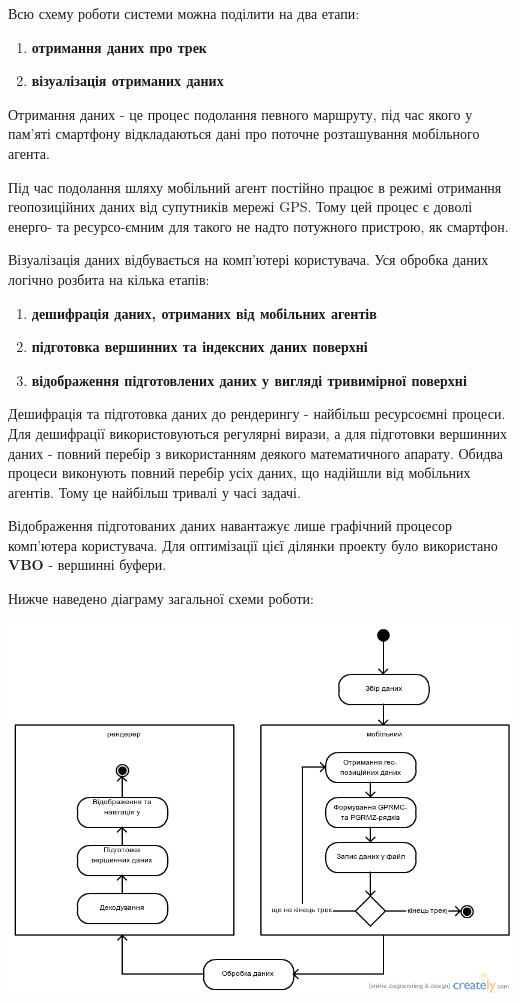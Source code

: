 \documentclass[simple,a4paper,14pt,ukrainian,utf8]{eskdtext}
\begin{document}
    Всю схему роботи системи можна поділити на два етапи:
    
    \begin{enumerate}
    	\item \textbf{отримання даних про трек}
    	\item \textbf{візуалізація отриманих даних}
    \end{enumerate}
    
    Отримання даних - це процес подолання певного маршруту, під час якого у пам’яті смартфону відкладаються дані про поточне розташування мобільного агента.
    
    Під час подолання шляху мобільний агент постійно працює в режимі отримання геопозиційних даних від супутників мережі GPS. Тому цей процес є доволі енерго- та ресурсо-ємним для такого не надто потужного пристрою, як смартфон.
    
    Візуалізація даних відбувається на комп’ютері користувача. Уся обробка даних логічно розбита на кілька етапів:
    
    \begin{enumerate}
    	\item \textbf{дешифрація даних, отриманих від мобільних агентів}
    	\item \textbf{підготовка вершинних та індексних даних поверхні}
    	\item \textbf{відображення підготовлених даних у вигляді тривимірної поверхні}
    \end{enumerate}
    
    Дешифрація та підготовка даних до рендерингу - найбільш ресурсоємні процеси. Для дешифрації використовуються регулярні вирази, а для підготовки вершинних даних - повний перебір з використанням деякого математичного апарату. Обидва процеси виконують повний перебір усіх даних, що надійшли від мобільних агентів. Тому це найбільш тривалі у часі задачі.
    
    Відображення підготованих даних навантажує лише графічний процесор комп’ютера користувача. Для оптимізації цієї ділянки проекту було використано \textbf{VBO} - вершинні буфери.

	Нижче наведено діаграму загальної схеми роботи:
	
	\vspace{3em}
	\includegraphics[scale=0.5]{images/general_workflow.png}
\end{document}
